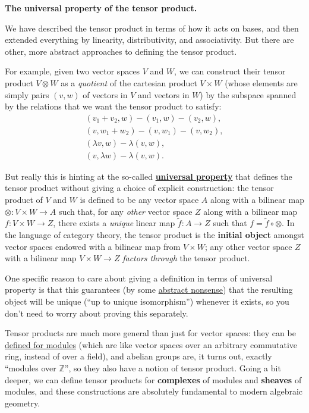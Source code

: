 \documentclass[fleqn,a4paper]{article}
\newenvironment{technical}[1]{\textbf{#1.}\par\vspace{.5\baselineskip}\everypar{\setlength{\parindent}{1.5em}}}{}
\theoremstyle{definition}
\theoremstyle{definition}
\theoremstyle{definition}
\theoremstyle{definition}
\theoremstyle{remark}
\begin{document}
\begin{technical}{The universal property of the tensor product}
We have described the tensor product in terms of how it acts on bases, and then extended everything by linearity, distributivity, and associativity.
But there are other, more abstract approaches to defining the tensor product.

For example, given two vector spaces \(V\) and \(W\), we can construct their tensor product \(V\otimes W\) as a \emph{quotient} of the cartesian product \(V\times W\) (whose elements are simply pairs \((v,w)\) of vectors in \(V\) and vectors in \(W\)) by the subspace spanned by the relations that we want the tensor product to satisfy:
\[
  \begin{gathered}
    (v_1+v_2,w)-(v_1,w)-(v_2,w),
  \\(v,w_1+w_2)-(v,w_1)-(v,w_2),
  \\(\lambda v,w)-\lambda(v,w),
  \\(v,\lambda w)-\lambda(v,w).
  \end{gathered}
\]

But really this is hinting at the so-called \href{https://en.wikipedia.org/wiki/Universal_property}{\textbf{universal property}} that defines the tensor product without giving a choice of explicit construction: the tensor product of \(V\) and \(W\) is defined to be any vector space \(A\) along with a bilinear map \(\otimes\colon V\times W\to A\) such that, for any \emph{other} vector space \(Z\) along with a bilinear map \(f\colon V\times W\to Z\), there exists a \emph{unique} linear map \(\tilde{f}\colon A\to Z\) such that \(f=\tilde{f}\circ\otimes\).
In the language of category theory, the tensor product is the \textbf{initial object} amongst vector spaces endowed with a bilinear map from \(V\times W\); any other vector space \(Z\) with a bilinear map \(V\times W\to Z\) \emph{factors through} the tensor product.

One specific reason to care about giving a definition in terms of universal property is that this guarantees (by some \href{https://en.wikipedia.org/wiki/Abstract_nonsense}{abstract nonsense}) that the resulting object will be unique (``up to unique isomorphism'') whenever it exists, so you don't need to worry about proving this separately.

Tensor products are much more general than just for vector spaces: they can be \href{https://en.wikipedia.org/wiki/Tensor_product_of_modules}{defined for modules} (which are like vector spaces over an arbitrary commutative ring, instead of over a field), and abelian groups are, it turns out, exactly ``modules over \(\mathbb{Z}\)'', so they also have a notion of tensor product.
Going a bit deeper, we can define tensor products for \textbf{complexes} of modules and \textbf{sheaves} of modules, and these constructions are absolutely fundamental to modern algebraic geometry.


\end{technical}
\end{document}
